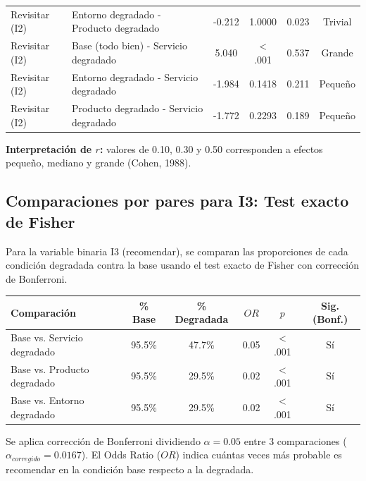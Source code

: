 \documentclass[
  spanish,
]{article}
\begin{document}
\begin{table}[!h]
\begin{tabular}{llcccc}
\hspace{1em}Revisitar (I2) & Entorno degradado - Producto degradado & -0.212 & 1.0000 & 0.023 & Trivial\\
\hspace{1em}Revisitar (I2) & Base (todo bien) - Servicio degradado & 5.040 & < .001 & 0.537 & Grande\\
\hspace{1em}Revisitar (I2) & Entorno degradado - Servicio degradado & -1.984 & 0.1418 & 0.211 & Pequeño\\
\hspace{1em}Revisitar (I2) & Producto degradado - Servicio degradado & -1.772 & 0.2293 & 0.189 & Pequeño\\
\bottomrule
\end{tabular}
\endgroup{}
\end{table}

\textbf{Interpretación de \(r\):} valores de 0.10, 0.30 y 0.50
corresponden a efectos pequeño, mediano y grande (Cohen, 1988).

\subsection{Comparaciones por pares para I3: Test exacto de
Fisher}\label{comparaciones-por-pares-para-i3-test-exacto-de-fisher}

Para la variable binaria I3 (recomendar), se comparan las proporciones
de cada condición degradada contra la base usando el test exacto de
Fisher con corrección de Bonferroni.

\begin{table}[!h]
\centering
\begin{tabular}{lccccc}
\toprule
Comparación & \% Base & \% Degradada & $OR$ & $p$ & Sig. (Bonf.)\\
\midrule
Base vs. Servicio degradado & 95.5\% & 47.7\% & 0.05 & < .001 & Sí\\
Base vs. Producto degradado & 95.5\% & 29.5\% & 0.02 & < .001 & Sí\\
Base vs. Entorno degradado & 95.5\% & 29.5\% & 0.02 & < .001 & Sí\\
\bottomrule
\end{tabular}
\end{table}

Se aplica corrección de Bonferroni dividiendo \(\alpha = 0.05\) entre 3
comparaciones (\(\alpha_{corregido} = 0.0167\)). El Odds Ratio (\(OR\))
indica cuántas veces más probable es recomendar en la condición base
respecto a la degradada.
\end{document}
